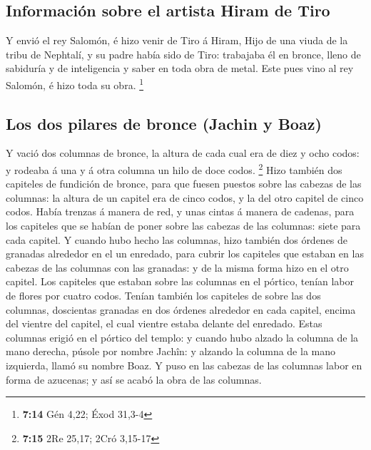 \hypertarget{informaciuxf3n-sobre-el-artista-hiram-de-tiro}{%
\subsection{Información sobre el artista Hiram de
Tiro}\label{informaciuxf3n-sobre-el-artista-hiram-de-tiro}}

 Y envió el rey Salomón, é hizo venir de Tiro á Hiram,
 Hijo de una viuda de la tribu de Nephtalí, y su padre
había sido de Tiro: trabajaba él en bronce, lleno de sabiduría y de
inteligencia y saber en toda obra de metal. Este pues vino al rey
Salomón, é hizo toda su obra. \footnote{\textbf{7:14} Gén 4,22; Éxod
  31,3-4}

\hypertarget{los-dos-pilares-de-bronce-jachin-y-boaz}{%
\subsection{Los dos pilares de bronce (Jachin y
Boaz)}\label{los-dos-pilares-de-bronce-jachin-y-boaz}}

 Y vació dos columnas de bronce, la altura de cada cual era
de diez y ocho codos: y rodeaba á una y á otra columna un hilo de doce
codos. \footnote{\textbf{7:15} 2Re 25,17; 2Cró 3,15-17} 
Hizo también dos capiteles de fundición de bronce, para que fuesen
puestos sobre las cabezas de las columnas: la altura de un capitel era
de cinco codos, y la del otro capitel de cinco codos. 
Había trenzas á manera de red, y unas cintas á manera de cadenas, para
los capiteles que se habían de poner sobre las cabezas de las columnas:
siete para cada capitel.  Y cuando hubo hecho las columnas,
hizo también dos órdenes de granadas alrededor en el un enredado, para
cubrir los capiteles que estaban en las cabezas de las columnas con las
granadas: y de la misma forma hizo en el otro capitel.  Los
capiteles que estaban sobre las columnas en el pórtico, tenían labor de
flores por cuatro codos.  Tenían también los capiteles de
sobre las dos columnas, doscientas granadas en dos órdenes alrededor en
cada capitel, encima del vientre del capitel, el cual vientre estaba
delante del enredado.  Estas columnas erigió en el pórtico
del templo: y cuando hubo alzado la columna de la mano derecha, púsole
por nombre Jachîn: y alzando la columna de la mano izquierda, llamó su
nombre Boaz.  Y puso en las cabezas de las columnas labor
en forma de azucenas; y así se acabó la obra de las columnas.

